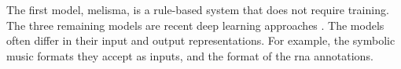 
The first model, \gls{melisma}, is a rule-based system that
does not require training. The three remaining models are
recent deep learning approaches \parencite{chen2021attend,
micchi2021deep, mcleod2021modular}. The models often differ
in their input and output representations. For example, the
symbolic music formats they accept as inputs, and the format
of the \gls{rna} annotations. 
